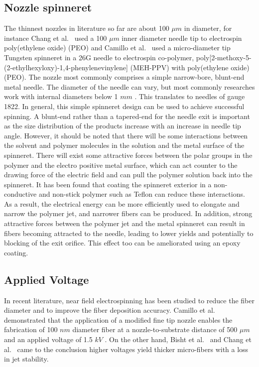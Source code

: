 \documentclass[5p,,preprint,12pt,twocolumn]{elsarticle}
\begin{document}
\subsection{Nozzle spinneret}The thinnest nozzles in literature so far are about 100 $\mu m $ in diameter, for instance Chang et al.\unskip~\cite{527120:11974306} used a 100 $\mu m $ inner diameter needle tip to electrospin poly(ethylene oxide) (PEO) and Camillo et al.\unskip~\cite{527120:12322072} used a micro-diameter tip Tungsten spinneret in a 26G needle to electrospin co-polymer, poly[2-methoxy-5-(2-ethylhexyloxy)-1,4-phenylenevinylene] (MEH-PPV) with poly(ethylene oxide) (PEO). The nozzle most commonly comprises a simple narrow-bore, blunt-end metal needle. The diameter of the needle can vary, but most commonly researches work with internal diameters below 1 $mm $ . This translates to needles of gauge 18{\textendash}22. In general, this simple spinneret design can be used to achieve successful spinning. A blunt-end rather than a tapered-end for the needle exit is important as the size distribution of the products increase with an increase in needle tip angle. However, it should be noted that there will be some interactions between the solvent and polymer molecules in the solution and the metal surface of the spinneret. There will exist some attractive forces between the polar groups in the polymer and the electro positive metal surface, which can act counter to the drawing force of the electric field and can pull the polymer solution back into the spinneret. It has been found that coating the spinneret exterior in a non-conductive and non-stick polymer such as Teflon can reduce these interactions.\unskip~\cite{527120:13082768} As a result, the electrical energy can be more efficiently used to elongate and narrow the polymer jet, and narrower fibers can be produced. In addition, strong attractive forces between the polymer jet and the metal spinneret can result in fibers becoming attracted to the needle, leading to lower yields and potentially to blocking of the exit orifice. This effect too can be ameliorated using an epoxy coating.\unskip~\cite{527120:13082811}



\subsection{Applied Voltage}In recent literature, near field electrospinning has been studied to reduce the fiber diameter and to improve the fiber deposition accuracy. Camillo et al.\unskip~\cite{527120:12322072} demonstrated that the application of a modified fine tip nozzle enables the fabrication of 100 $nm $ diameter fiber at a nozzle-to-substrate distance of 500 $\mu m $ and an applied voltage of 1.5 $kV $ . On the other hand, Bisht et al.\unskip~\cite{527120:11973130} and Chang et al.\unskip~\cite{527120:11974306} came to the conclusion higher voltages yield thicker micro-fibers with a loss in jet stability.
\end{document}
